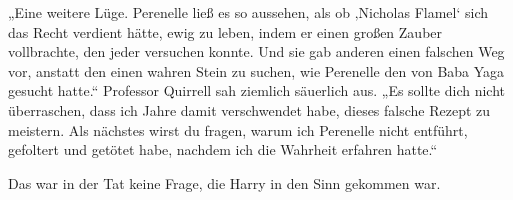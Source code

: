 „Eine weitere Lüge. Perenelle ließ es so aussehen, als ob ‚Nicholas Flamel‘ sich das Recht verdient hätte, ewig zu leben, indem er einen großen Zauber vollbrachte, den jeder versuchen konnte. Und sie gab anderen einen falschen Weg vor, anstatt den einen wahren Stein zu suchen, wie Perenelle den von Baba Yaga gesucht hatte.“
Professor Quirrell sah ziemlich säuerlich aus.
„Es sollte dich nicht überraschen, dass ich Jahre damit verschwendet habe, dieses falsche Rezept zu meistern. Als nächstes wirst du fragen, warum ich Perenelle nicht entführt, gefoltert und getötet habe, nachdem ich die Wahrheit erfahren hatte.“

Das war in der Tat keine Frage, die Harry in den Sinn gekommen war.

